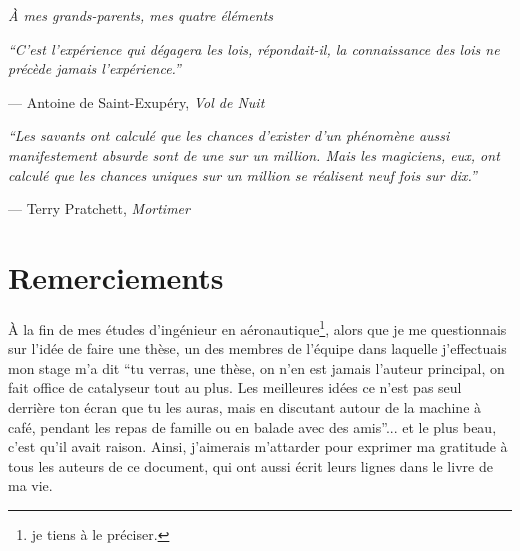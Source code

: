 \documentclass[english,a4paper,11pt,twoside]{StyleThese}
\begin{document}
\makeflyleaf

\cleardoublepage

\begin{flushright}
    \thispagestyle{empty}
    \textit{À mes grands-parents, mes quatre éléments}
    \epigraph{\textit{``C'est l'expérience qui dégagera les lois, répondait-il, la connaissance des lois ne précède jamais l'expérience.''}}{--- Antoine de Saint-Exupéry, \textit{Vol de Nuit}}    
    \epigraph{\textit{``Les savants ont calculé que les chances d'exister d'un phénomène aussi manifestement absurde sont de une sur un million. Mais les magiciens, eux, ont calculé que les chances uniques sur un million se réalisent neuf fois sur dix.''}}{--- Terry Pratchett, \textit{Mortimer}}
\end{flushright}
\cleardoublepage

\dominitoc


\cleardoublepage

%
%
\section*{Remerciements}

À la fin de mes études d'ingénieur en aéronautique\footnote{je tiens à le préciser.}, alors que je me questionnais sur l'idée de faire une thèse, un des membres de l'équipe dans laquelle j'effectuais mon stage m'a dit ``tu verras, une thèse, on n'en est jamais l'auteur principal, on fait office de catalyseur tout au plus. Les meilleures idées ce n'est pas seul derrière ton écran que tu les auras, mais en discutant autour de la machine à café, pendant les repas de famille ou en balade avec des amis''... et le plus beau, c'est qu'il avait raison. Ainsi, j'aimerais m'attarder pour exprimer ma gratitude à tous les auteurs de ce document, qui ont aussi écrit leurs lignes dans le livre de ma vie.
\end{document}
